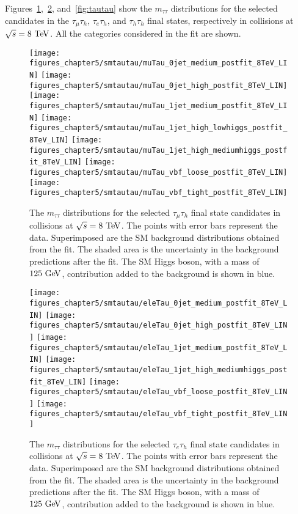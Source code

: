 Figures~\ref{fig:mtau},~\ref{fig:etau}, and~\ref{fig:tautau} show the $m_{\tau\tau}$ distributions for the selected candidates in the $\tau_{\mu}\tau_{h}$, $\tau_{e}\tau_{h}$, and $\tau_{h}\tau_{h}$ final states, respectively in collisions at $\sqrt{s}=8~\mathrm{Te\kern -0.1em V}$. All the categories considered in the fit are shown.
\begin{figure}[htbp]
\centering
\texttt{[image: figures\_chapter5/smtautau/muTau\_0jet\_medium\_postfit\_8TeV\_LIN]}
\texttt{[image: figures\_chapter5/smtautau/muTau\_0jet\_high\_postfit\_8TeV\_LIN]}
\texttt{[image: figures\_chapter5/smtautau/muTau\_1jet\_medium\_postfit\_8TeV\_LIN]}
\texttt{[image: figures\_chapter5/smtautau/muTau\_1jet\_high\_lowhiggs\_postfit\_8TeV\_LIN]}
\texttt{[image: figures\_chapter5/smtautau/muTau\_1jet\_high\_mediumhiggs\_postfit\_8TeV\_LIN]}
\texttt{[image: figures\_chapter5/smtautau/muTau\_vbf\_loose\_postfit\_8TeV\_LIN]}
\texttt{[image: figures\_chapter5/smtautau/muTau\_vbf\_tight\_postfit\_8TeV\_LIN]}
\caption{The $m_{\tau\tau}$ distributions for the selected $\tau_{\mu}\tau_{h}$ final state candidates in collisions at $\sqrt{s}=8~\mathrm{Te\kern -0.1em V}$. The points with error bars represent the data. Superimposed are the SM background distributions obtained from the fit. The shaded area is the uncertainty in the background predictions after the fit. The SM Higgs boson, with a mass of $125~\mathrm{Ge\kern -0.1em V}$, contribution added to the background is shown in blue.}
\label{fig:mtau}
\end{figure}
\begin{figure}[htbp]
\centering
\texttt{[image: figures\_chapter5/smtautau/eleTau\_0jet\_medium\_postfit\_8TeV\_LIN]}
\texttt{[image: figures\_chapter5/smtautau/eleTau\_0jet\_high\_postfit\_8TeV\_LIN]}
\texttt{[image: figures\_chapter5/smtautau/eleTau\_1jet\_medium\_postfit\_8TeV\_LIN]}
\texttt{[image: figures\_chapter5/smtautau/eleTau\_1jet\_high\_mediumhiggs\_postfit\_8TeV\_LIN]}
\texttt{[image: figures\_chapter5/smtautau/eleTau\_vbf\_loose\_postfit\_8TeV\_LIN]}
\texttt{[image: figures\_chapter5/smtautau/eleTau\_vbf\_tight\_postfit\_8TeV\_LIN]}
\caption{The $m_{\tau\tau}$ distributions for the selected $\tau_{e}\tau_{h}$ final state candidates in collisions at $\sqrt{s}=8~\mathrm{Te\kern -0.1em V}$. The points with error bars represent the data. Superimposed are the SM background distributions obtained from the fit. The shaded area is the uncertainty in the background predictions after the fit. The SM Higgs boson, with a mass of $125~\mathrm{Ge\kern -0.1em V}$, contribution added to the background is shown in blue.}
\label{fig:etau}
\end{figure}
